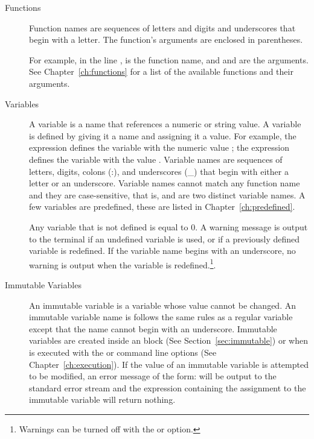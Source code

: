 \begin{description}

\item[Functions] Function names are sequences of letters and digits and underscores
\cmd{(\_)} that begin with a letter. The function's arguments are
enclosed in parentheses.

For example, in the line ,  is the
function name, and  and are the arguments. See
Chapter~\ref{ch:functions} for a list of the available functions and
their arguments.

\item[Variables] A variable is a name that references a numeric or string 
value. A variable is defined by giving it a name and assigning it a value. For 
example, the expression  defines the variable  with 
the numeric value ; the expression  
defines the variable  with the value . 
Variable names are sequences of letters, digits, colons (:), and underscores (\_) that begin 
with either a letter or an underscore. Variable names cannot match any function 
name and they are case-sensitive, that is,  and  
are two distinct variable names. A few variables are predefined, these are listed 
in  Chapter~\ref{ch:predefined}.

Any variable that is not defined is equal to 0. A warning message is
output to the terminal if an undefined variable is used, or if a
previously defined variable is redefined. If the variable
name begins with an underscore, no warning is output when the variable
is redefined.\footnote{Warnings can be turned off with the  or
 option.}.

\item[Immutable Variables]\label{immutable} An immutable variable is a variable whose
value cannot be changed. An immutable variable name is follows the
same rules as a regular variable except that the name cannot begin
with an underscore.  Immutable variables are created inside an
 block (See Section~\ref{sec:immutable}) or when
\aprepro{} is executed with the  or  command
line options (See Chapter~\ref{ch:execution}). If the value of an
immutable variable is attempted to be modified, an error message of
the form:
will be output to the standard error stream and the expression
containing the assignment to the immutable variable will return nothing.


\end{description}
